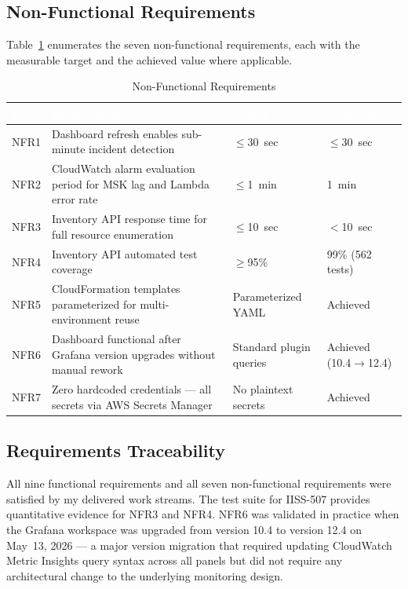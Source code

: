 \subsection{Non-Functional Requirements}

Table~\ref{tab:nonfunctional_requirements} enumerates the seven
non-functional requirements, each with the measurable target and the
achieved value where applicable.

\begin{table}[ht]
\centering
\caption{Non-Functional Requirements}
\label{tab:nonfunctional_requirements}
\begin{tabularx}{\textwidth}{p{0.9cm}Xp{2.2cm}p{3.0cm}}
\hline
\rowcolor{smubrand}\textcolor{white}{\textbf{ID}} & \textcolor{white}{\textbf{Requirement}} & \textcolor{white}{\textbf{Target}} & \textcolor{white}{\textbf{Achieved}} \\
\hline
NFR1 & Dashboard refresh enables sub-minute incident detection & $\leq$30~sec & $\leq$30~sec \\
NFR2 & CloudWatch alarm evaluation period for MSK lag and Lambda error rate & $\leq$1~min & 1~min \\
NFR3 & Inventory API response time for full resource enumeration & $\leq$10~sec & $<$10~sec \\
NFR4 & Inventory API automated test coverage & $\geq$95\% & 99\% (562 tests) \\
NFR5 & CloudFormation templates parameterized for multi-environment reuse & Parameterized YAML & Achieved \\
NFR6 & Dashboard functional after Grafana version upgrades without manual rework & Standard plugin queries & Achieved (10.4$\to$12.4) \\
NFR7 & Zero hardcoded credentials --- all secrets via AWS Secrets Manager & No plaintext secrets & Achieved \\
\hline
\end{tabularx}
\end{table}

\subsection{Requirements Traceability}

All nine functional requirements and all seven non-functional
requirements were satisfied by my delivered work streams. The
test suite for IISS-507 provides quantitative evidence for NFR3
and NFR4. NFR6 was validated in practice when the Grafana workspace
was upgraded from version 10.4 to version 12.4 on May~13, 2026 ---
a major version migration that required updating CloudWatch Metric
Insights query syntax across all panels but did not require any
architectural change to the underlying monitoring design.

